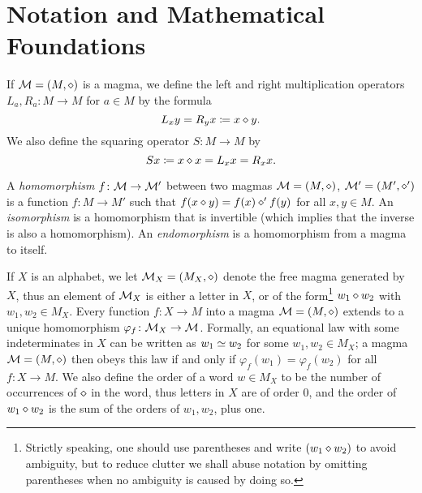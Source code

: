\section{Notation and Mathematical Foundations}\label{notation-sec}

If ${\mathcal{M}} = (M,\diamond)$ is a magma, we define the left and right multiplication operators $L_a, R_a \colon M \to M$ for $a \in M$ by the formula
\begin{equation}\label{left-right}
    L_x y = R_y x \coloneqq x \diamond y.
\end{equation}
We also define the squaring operator $S \colon M \to M$ by
\begin{equation}\label{square-def}
    Sx \coloneqq x \diamond x = L_x x = R_x x.
\end{equation}

A \emph{homomorphism} $f \colon {\mathcal{M}} \to {\mathcal{M}}'$ between two magmas ${\mathcal{M}} = (M,\diamond)$, ${\mathcal{M}}' = (M',\diamond')$ is a function $f \colon M \to M'$ such that $f(x \diamond y) = f(x) \diamond' f(y)$ for all $x,y \in M$.  An \emph{isomorphism} is a homomorphism that is invertible (which implies that the inverse is also a homomorphism).  An \emph{endomorphism} is a homomorphism from a magma to itself.

If $X$ is an alphabet, we let ${\mathcal{M}}_X = (M_X, \diamond)$ denote the free magma generated by $X$, thus an element of ${\mathcal{M}}_X$ is either a letter in $X$, or of the form\footnote{Strictly speaking, one should use parentheses and write $(w_1 \diamond w_2)$ to avoid ambiguity, but to reduce clutter we shall abuse notation by omitting parentheses when no ambiguity is caused by doing so.} $w_1 \diamond w_2$ with $w_1,w_2 \in M_X$.  Every function $f \colon X \to M$ into a magma ${\mathcal{M}} = (M,\diamond)$ extends to a unique homomorphism $\varphi_f \colon {\mathcal{M}}_X \to {\mathcal{M}}$.  Formally, an equational law with some indeterminates in $X$ can be written as $w_1 \simeq w_2$ for some $w_1, w_2 \in M_X$; a magma ${\mathcal{M}} = (M,\diamond)$ then obeys this law if and only if $\varphi_f(w_1) = \varphi_f(w_2)$ for all $f \colon X \to M$.  We also define the order of a word $w \in M_X$ to be the number of occurrences of $\diamond$ in the word, thus letters in $X$ are of order $0$, and the order of $w_1 \diamond w_2$ is the sum of the orders of $w_1, w_2$, plus one.

